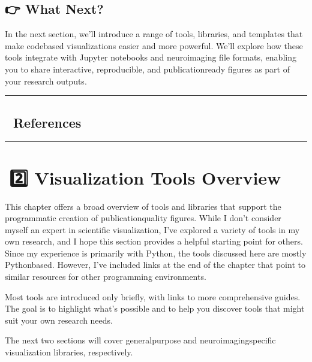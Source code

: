 \documentclass[letterpaper,10pt,english]{jupyterBook}
\begin{document}
\subsection{👉 What Next?}
\label{\detokenize{chapters/03/03a_programmatic-visualizations:what-next}}
\sphinxAtStartPar
In the next section, we’ll introduce a range of tools, libraries, and templates that make code\sphinxhyphen{}based visualizations easier and more powerful. We’ll explore how these tools integrate with Jupyter notebooks and neuroimaging file formats, enabling you to share interactive, reproducible, and publication\sphinxhyphen{}ready figures as part of your research outputs.


\bigskip\hrule\bigskip



\subsection{📑 References}
\label{\detokenize{chapters/03/03a_programmatic-visualizations:references}}

\bigskip\hrule\bigskip


\sphinxstepscope


\section{📙2️⃣ Visualization Tools Overview}
\label{\detokenize{chapters/03/03b_visualization-tools:visualization-tools-overview}}\label{\detokenize{chapters/03/03b_visualization-tools::doc}}
\sphinxAtStartPar
This chapter offers a broad overview of tools and libraries that support the programmatic creation of publication\sphinxhyphen{}quality figures. While I don’t consider myself an expert in scientific visualization, I’ve explored a variety of tools in my own research, and I hope this section provides a helpful starting point for others. Since my experience is primarily with Python, the tools discussed here are mostly Python\sphinxhyphen{}based. However, I’ve included links at the end of the chapter that point to similar resources for other programming environments.

\sphinxAtStartPar
Most tools are introduced only briefly, with links to more comprehensive guides. The goal is to highlight what’s possible and to help you discover tools that might suit your own research needs.

\sphinxAtStartPar
The next two sections will cover general\sphinxhyphen{}purpose and neuroimaging\sphinxhyphen{}specific visualization libraries, respectively.
\end{document}
